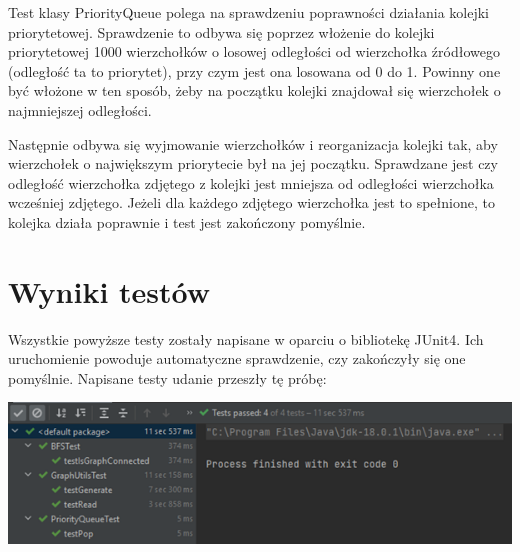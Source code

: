 \documentclass[11pt,a4paper]{report}
\def\console #1{\begingroup\fontfamily{qcr}\selectfont#1\endgroup}
\begin{document}
	Test klasy PriorityQueue polega na sprawdzeniu poprawności działania kolejki priorytetowej.
	Sprawdzenie to odbywa się poprzez włożenie do kolejki priorytetowej 1000 wierzchołków o losowej odległości od wierzchołka źródłowego 
	(odległość ta to priorytet), przy czym jest ona losowana od 0 do 1. Powinny one być włożone w ten sposób,
	żeby na początku kolejki znajdował się wierzchołek o najmniejszej odległości. 
	
	Następnie odbywa się wyjmowanie wierzchołków i reorganizacja kolejki tak, 
	aby wierzchołek o największym priorytecie był na jej początku. 
	Sprawdzane jest czy odległość wierzchołka zdjętego z kolejki jest mniejsza od odległości wierzchołka wcześniej zdjętego.
	Jeżeli dla każdego zdjętego wierzchołka jest to spełnione, to kolejka działa poprawnie i test jest zakończony pomyślnie.
	
	\vspace{2em}
	\section{Wyniki testów}
	
	Wszystkie powyższe testy zostały napisane w oparciu o bibliotekę \console{JUnit4}. Ich uruchomienie powoduje automatyczne sprawdzenie, czy zakończyły się one pomyślnie.
	Napisane testy udanie przeszły tę próbę:
	
	\begin{center}
        \includegraphics[width=\textwidth]{test_results.png}
    \end{center}
\end{document}
